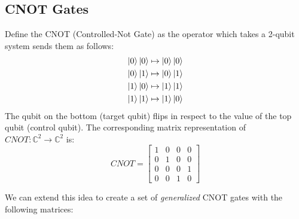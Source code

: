 \documentclass[quantum.tex]{subfiles}
\begin{document}
\subsection{CNOT Gates}
Define the CNOT (Controlled-Not Gate) as the operator which takes a 2-qubit system sends them as follows:
\begin{gather*}
  \ket{0}\ket{0} \mapsto \ket{0}\ket{0} \\
  \ket{0}\ket{1} \mapsto \ket{0}\ket{1} \\
  \ket{1}\ket{0} \mapsto \ket{1}\ket{1} \\
  \ket{1}\ket{1} \mapsto \ket{1}\ket{0}
\end{gather*}
The qubit on the bottom (target qubit) flips in respect to the value of the top qubit (control qubit). The corresponding matrix representation of $CNOT: \mathbb{C}^2 \rightarrow \mathbb{C}^2$ is:
  $$CNOT = \begin{bmatrix}1 & 0 & 0 & 0 \\ 0 & 1 & 0 & 0 \\ 0 & 0 & 0 & 1 \\ 0 & 0 & 1 & 0 \end{bmatrix} $$


We can extend this idea to create a set of \textit{generalized} CNOT gates with the following matrices:
\end{document}
